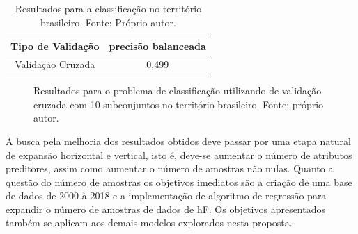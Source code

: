 \begin{table}[H]
\begin{center}
\begin{tabular}{|c|c|}
\hline
Tipo de Validação & precisão balanceada   \\ \hline
Validação Cruzada                   & 0,499   \\ \hline
\end{tabular}
\end{center}
\vspace{12pt}
\caption{Resultados para a classificação no território brasileiro. Fonte: Próprio autor.}
\label{tab:results_all_class}
\end{table}

\begin{figure}[H]
\center
{}
\caption{Resultados para o problema de classificação utilizando de validação cruzada com 10 subconjuntos no território brasileiro. Fonte: próprio autor.}
\label{fig:classallmik}
\end{figure}

A busca pela melhoria dos resultados obtidos deve passar por uma etapa natural de expansão horizontal e vertical, isto é, deve-se aumentar o número de atributos preditores, assim como aumentar o número de amostras não nulas. Quanto a questão do número de amostras os objetivos imediatos são a criação de uma base de dados de 2000 à 2018 e a implementação de algoritmo de regressão para expandir o número de amostras de dados de hF. Os objetivos apresentados também se aplicam aos demais modelos explorados nesta proposta.

